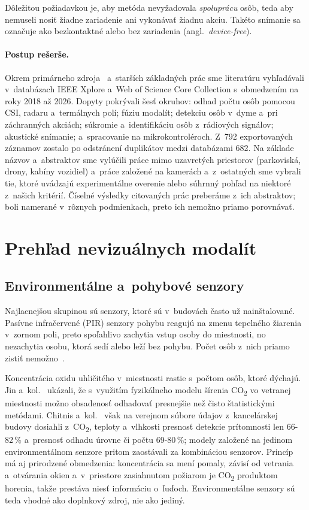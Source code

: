 \documentclass[10pt,twoside,a4paper]{article}
\begin{document}
Dôležitou požiadavkou je, aby metóda nevyžadovala \emph{spoluprácu} osôb, teda aby nemuseli nosiť žiadne zariadenie ani vykonávať žiadnu akciu. Takéto snímanie sa označuje ako bezkontaktné alebo bez zariadenia (angl.~\emph{device-free}).

\paragraph{Postup rešerše.} Okrem primárneho zdroja~\cite{sun2020review} a~starších základných prác sme literatúru vyhľadávali v~databázach IEEE Xplore a~Web of Science Core Collection s~obmedzením na roky 2018 až 2026. Dopyty pokrývali šesť okruhov: odhad počtu osôb pomocou CSI, radaru a~termálnych polí; fúziu modalít; detekciu osôb v~dyme a~pri záchranných akciách; súkromie a~identifikáciu osôb z~rádiových signálov; akustické snímanie; a~spracovanie na mikrokontroléroch. Z~792 exportovaných záznamov zostalo po odstránení duplikátov medzi databázami 682. Na základe názvov a~abstraktov sme vylúčili práce mimo uzavretých priestorov (parkoviská, drony, kabíny vozidiel) a~práce založené na kamerách a~z~ostatných sme vybrali tie, ktoré uvádzajú experimentálne overenie alebo súhrnný pohľad na niektoré z~našich kritérií. Číselné výsledky citovaných prác preberáme z~ich abstraktov; boli namerané v~rôznych podmienkach, preto ich nemožno priamo porovnávať.

\section{Prehľad nevizuálnych modalít}\label{prehlad}

\subsection{Environmentálne a~pohybové senzory}

Najlacnejšou skupinou sú senzory, ktoré sú v~budovách často už nainštalované. Pasívne infračervené (PIR) senzory pohybu reagujú na zmenu tepelného žiarenia v~zornom poli, preto spoľahlivo zachytia vstup osoby do miestnosti, no nezachytia osobu, ktorá sedí alebo leží bez pohybu. Počet osôb z~nich priamo zistiť nemožno~\cite{sun2020review}.

Koncentrácia oxidu uhličitého v~miestnosti rastie s~počtom osôb, ktoré dýchajú. Jin a~kol.~\cite{jin2018occupancy} ukázali, že s~využitím fyzikálneho modelu šírenia CO\textsubscript{2} vo vetranej miestnosti možno obsadenosť odhadovať presnejšie než čisto štatistickými metódami. Chitnis a~kol.~\cite{chitnis2025environmental} však na verejnom súbore údajov z~kancelárskej budovy dosiahli z~CO\textsubscript{2}, teploty a~vlhkosti presnosť detekcie prítomnosti len 66-82\,\% a~presnosť odhadu úrovne či počtu 69-80\,\%; modely založené na jedinom environmentálnom senzore pritom zaostávali za kombináciou senzorov. Princíp má aj prirodzené obmedzenia: koncentrácia sa mení pomaly, závisí od vetrania a~otvárania okien a~v~priestore zasiahnutom požiarom je CO\textsubscript{2} produktom horenia, takže prestáva niesť informáciu o~ľuďoch. Environmentálne senzory sú teda vhodné ako doplnkový zdroj, nie ako jediný.
\end{document}
